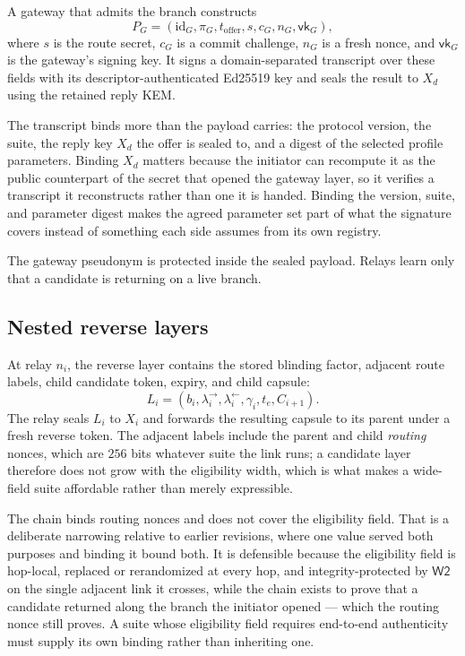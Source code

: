 \documentclass[11pt,oneside]{article}
\newcommand{\Wtwo}{\ensuremath{\mathsf{W2}}}
\begin{document}
A gateway that admits the branch constructs
\begin{equation}
P_G=(\mathrm{id}_G,\pi_G,t_{\mathrm{offer}},s,c_G,n_G,\mathsf{vk}_G),
\label{eq:candidatepayload}
\end{equation}
where $s$ is the route secret, $c_G$ is a commit challenge, $n_G$ is a fresh nonce, and $\mathsf{vk}_G$ is the gateway's signing key. It signs a domain-separated transcript over these fields with its descriptor-authenticated Ed25519 key and seals the result to $X_d$ using the retained reply KEM.

The transcript binds more than the payload carries: the protocol version, the suite, the reply key $X_d$ the offer is sealed to, and a digest of the selected profile parameters. Binding $X_d$ matters because the initiator can recompute it as the public counterpart of the secret that opened the gateway layer, so it verifies a transcript it reconstructs rather than one it is handed. Binding the version, suite, and parameter digest makes the agreed parameter set part of what the signature covers instead of something each side assumes from its own registry.

The gateway pseudonym is protected inside the sealed payload. Relays learn only that a candidate is returning on a live branch.

\subsection{Nested reverse layers}

At relay $n_i$, the reverse layer contains the stored blinding factor, adjacent route labels, child candidate token, expiry, and child capsule:
\begin{equation}
L_i=(b_i,\lambda_i^{\rightarrow},\lambda_i^{\leftarrow},
\gamma_i,t_e,C_{i+1}).
\end{equation}
The relay seals $L_i$ to $X_i$ and forwards the resulting capsule to its parent under a fresh reverse token. The adjacent labels include the parent and child \emph{routing} nonces, which are $256$ bits whatever suite the link runs; a candidate layer therefore does not grow with the eligibility width, which is what makes a wide-field suite affordable rather than merely expressible.

The chain binds routing nonces and does not cover the eligibility field. That is a deliberate narrowing relative to earlier revisions, where one value served both purposes and binding it bound both. It is defensible because the eligibility field is hop-local, replaced or rerandomized at every hop, and integrity-protected by \Wtwo{} on the single adjacent link it crosses, while the chain exists to prove that a candidate returned along the branch the initiator opened --- which the routing nonce still proves. A suite whose eligibility field requires end-to-end authenticity must supply its own binding rather than inheriting one.
\end{document}
